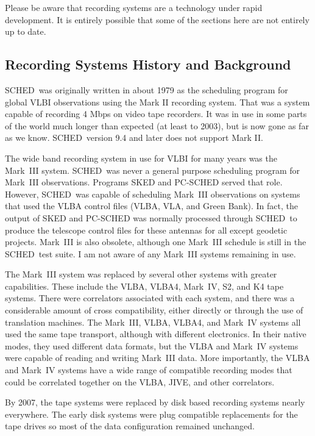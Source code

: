 \documentclass{report}
\newcommand{\schedb}{{\sc SCHED~}}
\begin{document}
Please be aware that recording systems are a technology under rapid
development.  It is entirely possible that some of the sections here
are not entirely up to date.

\subsection{\label{SSEC:RECBAK}Recording Systems History and Background}

\schedb was originally written in about 1979 as the scheduling program
for global VLBI observations using the Mark II recording system.  That
was a system capable of recording 4 Mbps on video tape recorders.  It
was in use in some parts of the world much longer than expected (at
least to 2003), but is now gone as far as we know.  \schedb version
9.4 and later does not support Mark II.

The wide band recording system in use for VLBI for many years was
the Mark~III system.  \schedb was never a general purpose scheduling
program for Mark~III observations.  Programs {\sc SKED} and {\sc PC-SCHED}
served that role.  However, \schedb was capable of scheduling Mark~III
observations on systems that used the VLBA control files (VLBA, VLA, and
Green Bank).  In fact, the output of {\sc SKED} and {\sc PC-SCHED} was
normally processed through \schedb to produce the telescope control files
for these antennas for all except geodetic projects.  Mark~III is also
obsolete, although one Mark~III schedule is still in the \schedb test
suite.  I am not aware of any Mark~III systems remaining in use.

The Mark~III system was replaced by several other systems with greater
capabilities.  These include the VLBA, VLBA4, Mark~IV, S2, and K4 tape
systems.  There were correlators associated with each system, and
there was a considerable amount of cross compatibility, either directly
or through the use of translation machines.  The Mark~III, VLBA,
VLBA4, and Mark~IV systems all used the same tape transport, although
with different electronics.  In their native modes, they used different
data formats, but the VLBA and Mark~IV systems were capable of reading
and writing Mark~III data.  More importantly, the VLBA and Mark~IV
systems have a wide range of compatible recording modes that could be
correlated together on the VLBA, JIVE, and other correlators.

By 2007, the tape systems were replaced by disk based recording
systems nearly everywhere.  The early disk systems were plug
compatible replacements for the tape drives so most of the data
configuration remained unchanged.  
\end{document}
